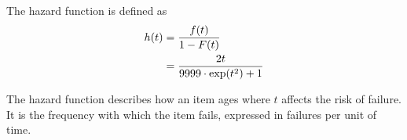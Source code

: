 \documentclass[british,a4paper,order=firstname]{mathscript}
\begin{document}
The hazard function is defined as
\begin{align}
	h(t) &= \frac{f(t)}{1-F(t)} \notag \\
	&= \frac{2t}{9999\cdot \exp(t^2)+1} \notag
\end{align}
\begin{center}
\end{center}
The hazard function describes how an item ages where $t$ affects the risk of failure. It is the frequency with which the item fails, expressed in failures per unit of time.
\end{document}
